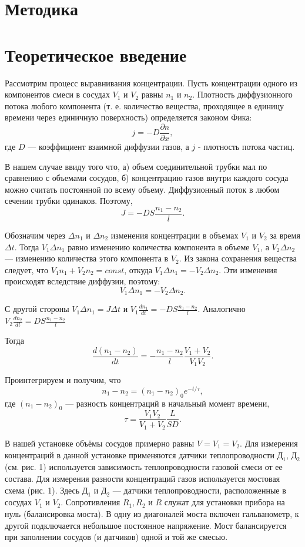\documentclass[12pt]{article}
\begin{document}
\section{Методика}
\section*{Теоретическое введение}
Рассмотрим процесс выравнивания концентрации. Пусть концентрации одного из компонентов смеси в сосудах $V_1$ и $V_2$ равны $n_1$ и
$n_2$. Плотность диффузионного потока любого компонента (т. е. количество вещества, проходящее в единицу времени через единичную поверхность) определяется законом Фика:
$$j=-D\frac{\partial n}{\partial x},$$ где $D$ — коэффициент взаимной диффузии газов, а $j$ - плотность потока частиц.

В нашем случае ввиду того что, а) объем соединительной трубки мал по сравнению с объемами сосудов, б) концентрацию газов внутри каждого сосуда можно считать постоянной по всему объему. Диффузионный поток в любом сечении трубки одинаков. Поэтому, $$J=-DS\frac{n_1-n_2}{l}.$$

Обозначим через $\Delta n_1$ и $\Delta n_2$ изменения концентрации в объемах
$V_1$ и $V_2$ за время $\Delta t$. Тогда $V_1 \Delta n_1$ равно изменению количества компонента в объеме $V_1$, а $V_2 \Delta n_2$ — изменению количества этого компонента в $V_2$. Из закона сохранения вещества следует, что $V_1n_1+V_2n_2 = const$, откуда $V_1 \Delta n_1 = -V_2\Delta n_2.$ Эти изменения происходят вследствие диффузии, поэтому: $$V_1\Delta n_1=-V_2\Delta n_2.$$

С другой стороны $V_1\Delta n_1=J\Delta t$ и $V_1\frac{dn_1}{dt}=-DS\frac{n_1-n_2}{l}.$ Аналогично $V_2\frac{dn_2}{dt}=DS\frac{n_1-n_2}{l}$

Тогда $$\frac{d(n_1-n_2)}{dt}=-\frac{n_1-n_2}{l} \frac{V_1+V_2}{V_1V_2}.$$

Проинтегрируем и получим, что $$n_1-n_2=(n_1-n_2)_0 e^{-t/\tau},$$ где $(n_1-
    n_2)_0$ — разность концентраций в начальный момент времени, $$\tau=\frac{V_1V_2}{V_1+V_2}\frac{L}{SD}.$$

В нашей установке объёмы сосудов примерно равны $V = V_1 = V_2$. 
Для измерения концентраций в данной установке применяются датчики теплопроводности $Д_1$, $Д_2$ (см. рис. 1) используется зависимость теплопроводности газовой смеси от ее состава.
Для измерения разности концентраций газов используется мостовая схема (рис. 1). Здесь $Д_1$ и $Д_2$ — датчики теплопроводности, расположенные в сосудах $V_1$ и $V_2$. Сопротивления $R_1, R_2$ и $R$ служат для установки прибора на нуль (балансировка моста). В одну из диагоналей моста включен гальванометр, к другой подключается небольшое постоянное напряжение. Мост балансируется при заполнении сосудов (и датчиков) одной и той же смесью.
\end{document}
